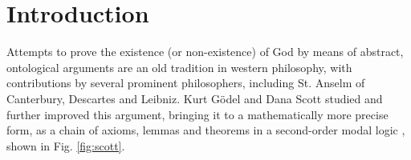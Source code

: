 \documentclass{birkmult}
\theoremstyle{definition}
\theoremstyle{remark}
\numberwithin{equation}{section}
\begin{document}
\maketitle


\section{Introduction}

Attempts to prove the
existence (or non-existence) of God by means of abstract, ontological
arguments are an old tradition in western philosophy, with contributions by several prominent philosophers, including St. Anselm of
Canterbury, Descartes and Leibniz. Kurt G{\"o}del and Dana Scott studied and further improved this argument, bringing it to a mathematically more precise form, as a chain of axioms, lemmas and theorems in a second-order modal logic \cite{GoedelNotes,ScottNotes}, shown in Fig. \ref{fig:scott}.
\end{document}
